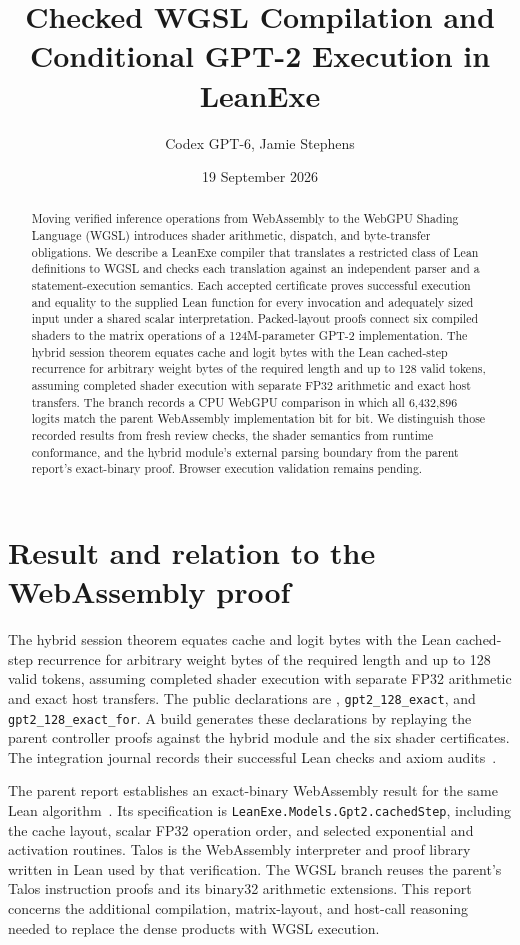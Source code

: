 \documentclass[11pt]{article}
\title{Checked WGSL Compilation and Conditional GPT-2 Execution in LeanExe}
\author{Codex GPT-6, Jamie Stephens}
\date{19 September 2026}
\newcommand{\code}[1]{\texttt{#1}}
\newcommand{\longcode}[1]{\texttt{\seqsplit{#1}}}
\begin{document}
\maketitle
\begin{abstract}
Moving verified inference operations from WebAssembly to the WebGPU Shading Language (WGSL) introduces shader arithmetic, dispatch, and byte-transfer obligations.  We describe a LeanExe compiler that translates a restricted class of Lean definitions to WGSL and checks each translation against an independent parser and a statement-execution semantics.  Each accepted certificate proves successful execution and equality to the supplied Lean function for every invocation and adequately sized input under a shared scalar interpretation.  Packed-layout proofs connect six compiled shaders to the matrix operations of a 124M-parameter GPT-2 implementation.  The hybrid session theorem equates cache and logit bytes with the Lean cached-step recurrence for arbitrary weight bytes of the required length and up to 128 valid tokens, assuming completed shader execution with separate FP32 arithmetic and exact host transfers.  The branch records a CPU WebGPU comparison in which all 6,432,896 logits match the parent WebAssembly implementation bit for bit.  We distinguish those recorded results from fresh review checks, the shader semantics from runtime conformance, and the hybrid module's external parsing boundary from the parent report's exact-binary proof.  Browser execution validation remains pending.
\end{abstract}

\section{Result and relation to the WebAssembly proof}

The hybrid session theorem equates cache and logit bytes with the Lean cached-step recurrence for arbitrary weight bytes of the required length and up to 128 valid tokens, assuming completed shader execution with separate FP32 arithmetic and exact host transfers.  The public declarations are \longcode{Project.Gpt2Hybrid.Spec.cachedStep\_exact}, \code{gpt2\_128\_exact}, and \code{gpt2\_128\_exact\_for}.  A build generates these declarations by replaying the parent controller proofs against the hybrid module and the six shader certificates.  The integration journal records their successful Lean checks and axiom audits~\cite{composition,journal}.

The parent report establishes an exact-binary WebAssembly result for the same Lean algorithm~\cite{parent}.  Its specification is \code{LeanExe.Models.Gpt2.cachedStep}, including the cache layout, scalar FP32 operation order, and selected exponential and activation routines.  Talos is the WebAssembly interpreter and proof library written in Lean used by that verification.  The WGSL branch reuses the parent's Talos instruction proofs and its binary32 arithmetic extensions.  This report concerns the additional compilation, matrix-layout, and host-call reasoning needed to replace the dense products with WGSL execution.
\end{document}

